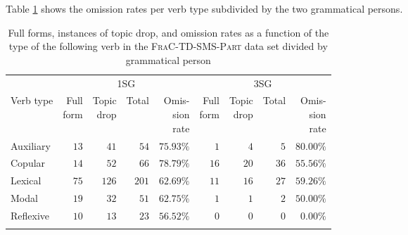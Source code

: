 Table \ref{tab:frac.verb.type.part} shows the omission rates per verb type subdivided by the two grammatical persons.

\begin{table}
\centering
\caption{Full forms, instances of topic drop, and omission rates as a function of the type of the following verb in the \textsc{FraC-TD-SMS-Part} data set divided by grammatical person}
\begin{tabular}{lrrrrrrrr}
\lsptoprule
& \multicolumn{4}{c}{1SG}  & \multicolumn{4}{c}{3SG}  \\
Verb type & \Centerstack[c]{Full\\form} & \Centerstack[c]{Topic\\drop} & Total & \Centerstack[c]{Omis-\\sion\\rate} & \Centerstack[c]{Full\\form} & \Centerstack[c]{Topic\\drop} & Total & \Centerstack[c]{Omis-\\sion\\rate} \\
\midrule
Auxiliary & $13$ & $41$ & $54$ & $75.93\%$  & $1$ & $4$ & $5$ & $80.00\%$ \\
Copular & $14$ & $52$ & $66$ & $78.79\%$  & $16$ & $20$ & $36$ & $55.56\%$ \\
Lexical& $75$ & $126$ & $201$ & $62.69\%$ & $11$ & $16$ & $27$ & $59.26\%$ \\
Modal & $19$ & $32$ & $51$ & $62.75\%$ & $1$ & $1$ & $2$ & $50.00\%$ \\
Reflexive& $10$ & $13$ & $23$ & $56.52\%$ & $0$ & $0$ & $0$ & $0.00\%$ \\
\lspbottomrule
\end{tabular}
\label{tab:frac.verb.type.part}
\end{table}

